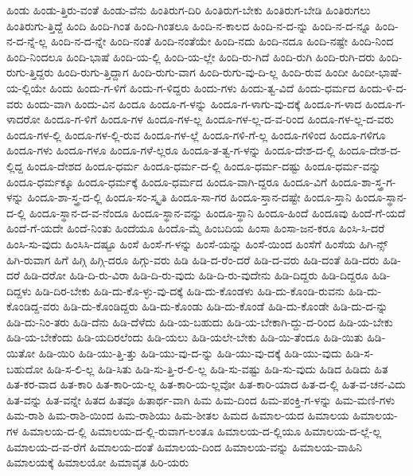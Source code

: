 {ಹಿಂಡು
ಹಿಂಡು-ತ್ತಿರು-ವಂತೆ
ಹಿಂಡು-ವೆನು
ಹಿಂತಿರುಗ-ದಿರಿ
ಹಿಂತಿರುಗ-ಬೇಕು
ಹಿಂತಿರುಗ-ಬೇಡಿ
ಹಿಂತಿರುಗಲು
ಹಿಂತಿರುಗು-ತ್ತಿದ್ದೆ
ಹಿಂದಿ
ಹಿಂದಿ-ಗಿಂತ
ಹಿಂದಿ-ಗಿಂತಲೂ
ಹಿಂದಿ-ನ-ಕಾಲದ
ಹಿಂದಿ-ನ-ದ-ನ್ನು
ಹಿಂದಿ-ನ-ದ-ನ್ನೂ
ಹಿಂದಿ-ನ-ದ-ನ್ನೆ-ಲ್ಲ
ಹಿಂದಿ-ನ-ದ-ನ್ನೇ
ಹಿಂದಿ-ನಂತೆ
ಹಿಂದಿ-ನಂತೆಯೇ
ಹಿಂದಿ-ನದು
ಹಿಂದಿ-ನದೂ
ಹಿಂದಿ-ನಷ್ಟೇ
ಹಿಂದಿ-ನಿಂದ
ಹಿಂದಿ-ನಿಂದಲೂ
ಹಿಂದಿ-ಭಾಷೆ
ಹಿಂದಿ-ಯ-ಲ್ಲಿ
ಹಿಂದಿ-ಯ-ಲ್ಲೇ
ಹಿಂದಿ-ರು-ಗಿದೆ
ಹಿಂದಿ-ರುಗಿ
ಹಿಂದಿ-ರುಗಿ-ದರು
ಹಿಂದಿ-ರುಗು-ತ್ತಿದ್ದರು
ಹಿಂದಿ-ರುಗು-ತ್ತಿದ್ದಾಗ
ಹಿಂದಿ-ರುಗು-ವಾಗ
ಹಿಂದಿ-ರುಗು-ವು-ದಿ-ಲ್ಲ
ಹಿಂದಿ-ರುವ
ಹಿಂದೀ
ಹಿಂದೀ-ಭಾಷೆ-ಯ-ಲ್ಲಿಯೇ
ಹಿಂದು
ಹಿಂದು-ಗ-ಳಿಗೆ
ಹಿಂದು-ಗ-ಳಿದ್ದರು
ಹಿಂದು-ಗಳು
ಹಿಂದು-ತ್ವ-ವಿದೆ
ಹಿಂದು-ಧರ್ಮದ
ಹಿಂದು-ಳಿ-ದ-ವರು
ಹಿಂದು-ವಾಗಿ
ಹಿಂದು-ವಿನ
ಹಿಂದೂ
ಹಿಂದೂ-ಗ-ಳನ್ನು
ಹಿಂದೂ-ಗ-ಳಾಗು-ವು-ದಕ್ಕೆ
ಹಿಂದೂ-ಗ-ಳಾದ
ಹಿಂದೂ-ಗ-ಳಾದರೋ
ಹಿಂದೂ-ಗ-ಳಿಗೆ
ಹಿಂದೂ-ಗಳ
ಹಿಂದೂ-ಗಳ-ಲ್ಲ
ಹಿಂದೂ-ಗಳ-ಲ್ಲ-ದ-ವ-ರಿಂದ
ಹಿಂದೂ-ಗಳ-ಲ್ಲ-ದ-ವರು
ಹಿಂದೂ-ಗಳ-ಲ್ಲಿ
ಹಿಂದೂ-ಗಳ-ಲ್ಲಿ-ರುವ
ಹಿಂದೂ-ಗಳ-ಲ್ಲೆ
ಹಿಂದೂ-ಗಳಿ-ಗೆ-ಲ್ಲ
ಹಿಂದೂ-ಗಳಿಂದ
ಹಿಂದೂ-ಗಳಿಗೂ
ಹಿಂದೂ-ಗಳು
ಹಿಂದೂ-ಗಳೂ
ಹಿಂದೂ-ಗಳೆ-ಲ್ಲರೂ
ಹಿಂದೂ-ತ-ತ್ವ-ಗ-ಳನ್ನು
ಹಿಂದೂ-ದೇಶ-ದ-ಲ್ಲಿ
ಹಿಂದೂ-ದೇಶ-ದ-ಲ್ಲಿದ್ದ
ಹಿಂದೂ-ದೇಶದ
ಹಿಂದೂ-ಧರ್ಮ
ಹಿಂದೂ-ಧರ್ಮ-ದ-ಲ್ಲಿ
ಹಿಂದೂ-ಧರ್ಮ-ದಷ್ಟು
ಹಿಂದೂ-ಧರ್ಮ-ವನ್ನು
ಹಿಂದೂ-ಧರ್ಮಕ್ಕೂ
ಹಿಂದೂ-ಧರ್ಮಕ್ಕೆ
ಹಿಂದೂ-ಧರ್ಮದ
ಹಿಂದೂ-ವಾಗಿ-ದ್ದರೂ
ಹಿಂದೂ-ವಿಗೆ
ಹಿಂದೂ-ಶಾ-ಸ್ತ್ರ-ಗ-ಳನ್ನು
ಹಿಂದೂ-ಶಾ-ಸ್ತ್ರ-ದ-ಲ್ಲಿ
ಹಿಂದೂ-ಸಂ-ಸ್ಕೃತಿ
ಹಿಂದೂ-ಸಾ-ಗರ
ಹಿಂದೂ-ಸ್ತಾನ-ದಷ್ಟೇ
ಹಿಂದೂ-ಸ್ತಾನಿ
ಹಿಂದೂ-ಸ್ಥಾನ-ದ-ಲ್ಲಿ
ಹಿಂದೂ-ಸ್ಥಾನ-ದ-ವ-ನೆಂದೂ
ಹಿಂದೂ-ಸ್ಥಾನ-ವನ್ನು
ಹಿಂದೂ-ಸ್ಥಾನಿ
ಹಿಂದೂ-ಹಿಂದೆ
ಹಿಂದೂವು
ಹಿಂದೆ-ಗೆ-ಯದೆ
ಹಿಂದೆ-ಗೆ-ಯದೇ
ಹಿಂದೆ-ನಿಂತು
ಹಿಂದೆಯೂ
ಹಿಂದೊ-ಮ್ಮೆ
ಹಿಂಬದಿಯ
ಹಿಂಸಾ
ಹಿಂಸಾ-ಜನ-ಕರೂ
ಹಿಂಸಿ-ಸಿ-ದರೆ
ಹಿಂಸಿ-ಸು-ವುದು
ಹಿಂಸಿಸಿ-ದಷ್ಟೂ
ಹಿಂಸೆ
ಹಿಂಸೆ-ಗ-ಳನ್ನು
ಹಿಂಸೆ-ಯನ್ನು
ಹಿಂಸೆ-ಯಿಂದ
ಹಿಂಸೆಗೆ
ಹಿಂಸೆಯ
ಹಿಗಿ-ನ್ಸ್
ಹಿಗಿ-ರುವಾಗ
ಹಿಗೆ
ಹಿಗ್ಗಿ
ಹಿಗ್ಗಿ-ದರೂ
ಹಿಗ್ಗು-ವರು
ಹಿಡಿ
ಹಿಡಿ-ದ-ರೆಂ-ದರೆ
ಹಿಡಿ-ದ-ವರು
ಹಿಡಿ-ದಂತೆ
ಹಿಡಿ-ದರು
ಹಿಡಿ-ದರೆ
ಹಿಡಿ-ದರೋ
ಹಿಡಿ-ದಿ-ರು-ವಿರಾ
ಹಿಡಿ-ದಿ-ರು-ವುದು
ಹಿಡಿ-ದಿ-ರು-ವುದೇನು
ಹಿಡಿ-ದಿದ್ದರು
ಹಿಡಿ-ದಿದ್ದರೂ
ಹಿಡಿ-ದಿದ್ದಳು
ಹಿಡಿ-ದಿರ-ಬೇಕು
ಹಿಡಿ-ದು-ಕೊ-ಳ್ಳು-ವು-ದಕ್ಕೆ
ಹಿಡಿ-ದು-ಕೊಂಡಳು
ಹಿಡಿ-ದು-ಕೊಂಡಿ-ರುವನು
ಹಿಡಿ-ದು-ಕೊಂಡಿದ್ದ-ವರು
ಹಿಡಿ-ದು-ಕೊಂಡಿದ್ದರು
ಹಿಡಿ-ದು-ಕೊಂಡು
ಹಿಡಿ-ದು-ಕೊಂಡೆ
ಹಿಡಿ-ದು-ಕೊಂಡೇ
ಹಿಡಿ-ದು-ದ-ನ್ನು
ಹಿಡಿ-ದು-ನಿಂ-ತರು
ಹಿಡಿ-ದೆನು
ಹಿಡಿ-ದೆಳೆದು
ಹಿಡಿ-ಯ-ಬಹುದು
ಹಿಡಿ-ಯ-ಬೇಕಾಗಿ-ದ್ದು-ದ-ರಿಂದ
ಹಿಡಿ-ಯ-ಬೇಕು
ಹಿಡಿ-ಯ-ಬೇಕೆಂದು
ಹಿಡಿ-ಯದಿರಲೆಂದು
ಹಿಡಿ-ಯಲು
ಹಿಡಿ-ಯಲೇ-ಬೇಕು
ಹಿಡಿ-ಯಿ-ತೆಂದೂ
ಹಿಡಿ-ಯಿತು
ಹಿಡಿ-ಯಿತೋ
ಹಿಡಿ-ಯಿರಿ
ಹಿಡಿ-ಯು-ತ್ತಿ-ತ್ತು
ಹಿಡಿ-ಯು-ವು-ದ-ನ್ನು
ಹಿಡಿ-ಯು-ವು-ದಕ್ಕೆ
ಹಿಡಿ-ಯು-ವುದು
ಹಿಡಿ-ಸ-ಬಹುದೋ
ಹಿಡಿ-ಸ-ಲಿ-ಲ್ಲ
ಹಿಡಿ-ಸಿತು
ಹಿಡಿ-ಸು-ತ್ತಿ-ರ-ಲಿ-ಲ್ಲ
ಹಿಡಿ-ಸು-ವಷ್ಟು
ಹಿಡಿ-ಸು-ವುದು
ಹಿಡಿದ
ಹಿಡಿದು
ಹಿತ
ಹಿತ-ಕರ-ವಾದ
ಹಿತ-ಕಾರಿ
ಹಿತ-ಕಾರಿ-ಯ-ಲ್ಲ
ಹಿತ-ಕಾರಿ-ಯ-ಲ್ಲವೋ
ಹಿತ-ಕಾರಿ-ಯಾದ
ಹಿತ-ದ-ಲ್ಲಿ
ಹಿತ-ವ-ಚನ-ವಿದು
ಹಿತ-ವನ್ನು
ಹಿತ-ವನ್ನೇ
ಹಿತದ
ಹಿತವೂ
ಹಿತಾರ್ಥ-ವಾಗಿ
ಹಿಮ
ಹಿಮ-ದಿಂದ
ಹಿಮ-ಪಂಕ್ತಿ-ಗ-ಳನ್ನು
ಹಿಮ-ಮಣಿ-ಗಳು
ಹಿಮ-ರಾಶಿ
ಹಿಮ-ರಾಶಿ-ಯಿಂದ
ಹಿಮ-ರಾಶಿಯು
ಹಿಮ-ಶೀತಲ
ಹಿಮದ
ಹಿಮಾಲ-ಯದ
ಹಿಮಾಲಯ
ಹಿಮಾಲಯ-ಗಳ
ಹಿಮಾಲಯ-ದ-ಲ್ಲಿ
ಹಿಮಾಲಯ-ದ-ಲ್ಲಿ-ರುವಾಗ-ಲಂತೂ
ಹಿಮಾಲಯ-ದ-ಲ್ಲಿಯೂ
ಹಿಮಾಲಯ-ದ-ಲ್ಲೆ-ಲ್ಲ
ಹಿಮಾಲಯ-ದ-ವ-ರೆಗೆ
ಹಿಮಾಲಯ-ದಂತೆ
ಹಿಮಾಲಯ-ದಿಂದ
ಹಿಮಾಲಯ-ವನ್ನು
ಹಿಮಾಲಯ-ವಾಹಿನಿ
ಹಿಮಾಲಯಕ್ಕೆ
ಹಿಮಾಲಯೋ
ಹಿಮಾವೃತ
ಹಿರಿ-ಯರು
}
